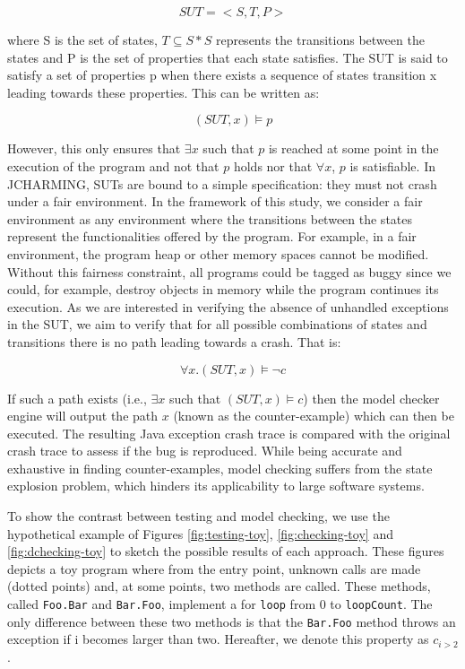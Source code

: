 \begin{equation}
SUT = <S,T,P>
\end{equation}

where S is the set of states, $T \subseteq S * S$ represents the transitions between the states and P is the set of properties that each state satisfies. The SUT is said to satisfy a set of properties p when there exists a sequence of states transition x leading towards these properties. This can be written as:

\begin{equation}
(SUT, x)  \models p
\end{equation}

However, this only ensures that $\exists x$ such that $p$ is reached at some point in the execution of the program and not that $p$ holds nor that $\forall x$, $p$ is satisfiable. In JCHARMING, SUTs are bound to a simple specification: they must not crash under a fair environment. In the framework of this study, we consider a fair environment as any environment where the transitions between the states represent the functionalities offered by the program. For example, in a fair environment, the program heap or other memory spaces cannot be modified. Without this fairness constraint, all programs could be tagged as buggy since we could, for example, destroy objects in memory while the program continues its execution. As we are interested in verifying the absence of unhandled exceptions in the SUT, we aim to verify that for all possible combinations of states and transitions there is no path leading towards a crash. That is:

\begin{equation}
\forall x.(SUT, x) \models \neg c
\end{equation}

If such a path exists (i.e., $\exists x$  such that $(SUT, x)  \models c$) then the model checker engine will output the path $x$ (known as the counter-example) which can then be executed. The resulting Java exception crash trace is compared with the original crash trace to assess if the bug is reproduced. While  being  accurate and exhaustive in finding counter-examples, model checking suffers from the state explosion problem, which hinders its applicability to large software systems.


To show the contrast between testing and model checking, we use the hypothetical example of Figures \ref{fig:testing-toy}, \ref{fig:checking-toy} and \ref{fig:dchecking-toy} to sketch the possible results of each approach. These figures depicts a toy program where from the entry point, unknown calls are made (dotted points) and, at some points, two methods are called. These methods, called \texttt{Foo.Bar} and \texttt{Bar.Foo}, implement a for \texttt{loop} from 0 to \texttt{loopCount}. The only difference between these two methods is that the \texttt{Bar.Foo} method throws an exception if i becomes larger than two. Hereafter, we denote this property as $c_{i > 2}$.


